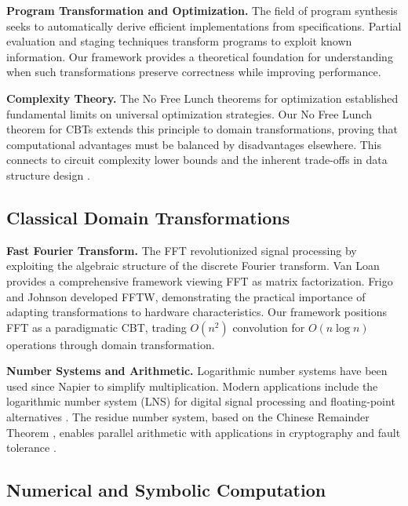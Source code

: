 \documentclass[11pt]{article}
\theoremstyle{definition}
\begin{document}
\textbf{Program Transformation and Optimization.} The field of program synthesis \cite{gulwani2017program} seeks to automatically derive efficient implementations from specifications. Partial evaluation and staging techniques \cite{jones1993partial} transform programs to exploit known information. Our framework provides a theoretical foundation for understanding when such transformations preserve correctness while improving performance.

\textbf{Complexity Theory.} The No Free Lunch theorems for optimization \cite{wolpert1997no} established fundamental limits on universal optimization strategies. Our No Free Lunch theorem for CBTs extends this principle to domain transformations, proving that computational advantages must be balanced by disadvantages elsewhere. This connects to circuit complexity lower bounds \cite{arora2009computational} and the inherent trade-offs in data structure design \cite{patrascu2006towards}.

\subsection{Classical Domain Transformations}

\textbf{Fast Fourier Transform.} The FFT \cite{cooley1965algorithm} revolutionized signal processing by exploiting the algebraic structure of the discrete Fourier transform. Van Loan \cite{van1992computational} provides a comprehensive framework viewing FFT as matrix factorization. Frigo and Johnson \cite{frigo2005design} developed FFTW, demonstrating the practical importance of adapting transformations to hardware characteristics. Our framework positions FFT as a paradigmatic CBT, trading $O(n^2)$ convolution for $O(n \log n)$ operations through domain transformation.

\textbf{Number Systems and Arithmetic.} Logarithmic number systems have been used since Napier \cite{napier1614mirifici} to simplify multiplication. Modern applications include the logarithmic number system (LNS) for digital signal processing \cite{arnold2001logarithmic} and floating-point alternatives \cite{coleman2008european}. The residue number system, based on the Chinese Remainder Theorem \cite{sunzi500}, enables parallel arithmetic \cite{szabo1967residue} with applications in cryptography \cite{bajard1998rns} and fault tolerance \cite{watson1967self}.

\subsection{Numerical and Symbolic Computation}
\end{document}
